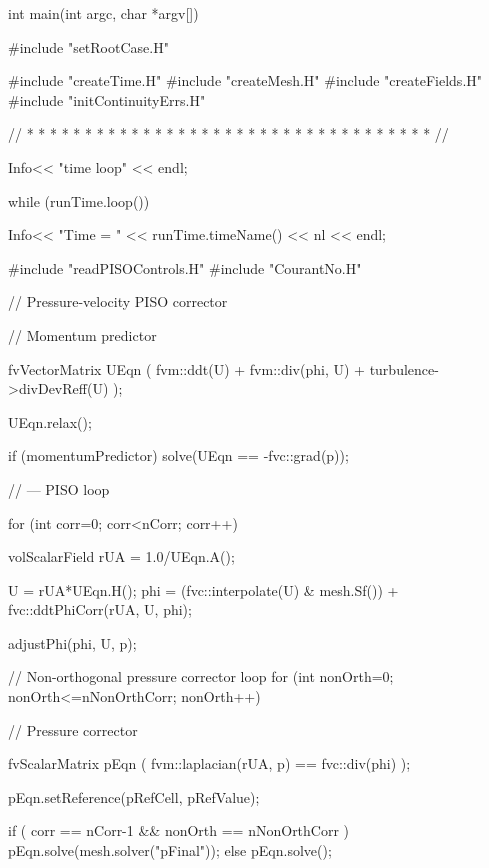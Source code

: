 \begin{OFverbatim}
int main(int argc, char *argv[])
{
    #include "setRootCase.H"

    #include "createTime.H"
    #include "createMesh.H"
    #include "createFields.H"
    #include "initContinuityErrs.H"

    // * * * * * * * * * * * * * * * * * * * * * * * * * * * * * * * * * * * //

    Info<< "\nStarting time loop\n" << endl;

    while (runTime.loop())
    {
        Info<< "Time = " << runTime.timeName() << nl << endl;

        #include "readPISOControls.H"
        #include "CourantNo.H"

        // Pressure-velocity PISO corrector
        {
            // Momentum predictor

            fvVectorMatrix UEqn
            (
                fvm::ddt(U)
              + fvm::div(phi, U)
              + turbulence->divDevReff(U)
            );

            UEqn.relax();

            if (momentumPredictor)
            {
                solve(UEqn == -fvc::grad(p));
            }

            // --- PISO loop

            for (int corr=0; corr<nCorr; corr++)
            {
                volScalarField rUA = 1.0/UEqn.A();

                U = rUA*UEqn.H();
                phi = (fvc::interpolate(U) & mesh.Sf())
                    + fvc::ddtPhiCorr(rUA, U, phi);

                adjustPhi(phi, U, p);

                // Non-orthogonal pressure corrector loop
                for (int nonOrth=0; nonOrth<=nNonOrthCorr; nonOrth++)
                {
                    // Pressure corrector

                    fvScalarMatrix pEqn
                    (
                        fvm::laplacian(rUA, p) == fvc::div(phi)
                    );

                    pEqn.setReference(pRefCell, pRefValue);

                    if
                    (
                        corr == nCorr-1
                     && nonOrth == nNonOrthCorr
                    )
                    {
                        pEqn.solve(mesh.solver("pFinal"));
                    }
                    else
                    {
                        pEqn.solve();
                    }

}}}}}
\end{OFverbatim}
